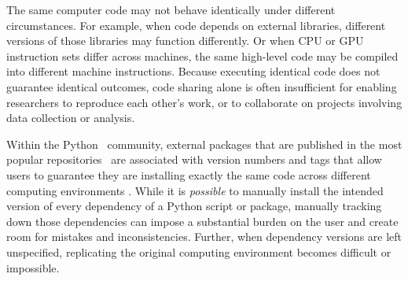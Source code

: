 \documentclass[preprint,12pt,a4paper]{elsarticle}
\begin{document}
The same computer code may not behave identically under different
circumstances.  For example, when code depends on external libraries,
different versions of those libraries may function differently.  Or
when CPU or GPU instruction sets differ across machines, the same
high-level code may be compiled into different machine instructions.
Because executing identical code does not guarantee identical
outcomes, code sharing alone is often insufficient for
enabling researchers to reproduce each other's work, or to collaborate on
projects involving data collection or analysis.

Within the Python~\cite{vanR95} community, external
packages that are published in the most popular
repositories~\cite{Pyth03, cond15} are associated with version numbers
and tags that allow users to guarantee they are installing
exactly the same code across different computing environments \cite{CoghStuf13}.
While it is \textit{possible} to manually install the intended
version of every dependency of a Python script or package, manually
tracking down those dependencies can impose a substantial burden on
the user and create room for mistakes and inconsistencies. Further, when dependency versions
are left unspecified, replicating the original computing environment
becomes difficult or impossible.
\end{document}
